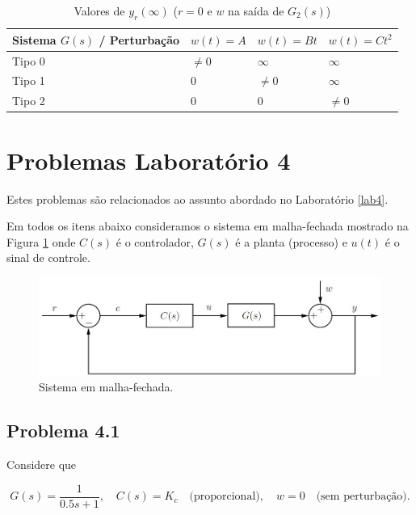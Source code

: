 \documentclass[
]{book}
\theoremstyle{definition}
\theoremstyle{definition}
\theoremstyle{definition}
\theoremstyle{remark}
\begin{document}
\begin{table}

\caption{\label{tab:tab43}Valores de $y_r(\infty)$ ($r=0$ e $w$ na saída de $G_2(s)$)}
\centering
\begin{tabular}[t]{llll}
\toprule
Sistema $G(s)$ / Perturbação & $w(t)=A$ & $w(t) = Bt$ & $w(t) = Ct^2$\\
\midrule
Tipo 0 & $\neq 0$ & $\infty$ & $\infty$\\
Tipo 1 & 0 & $\neq 0$ & $\infty$\\
Tipo 2 & 0 & 0 & $\neq 0$\\
\bottomrule
\end{tabular}
\end{table}

\hypertarget{problemas-laboratuxf3rio-4}{%
\chapter*{Problemas Laboratório 4}\label{problemas-laboratuxf3rio-4}}

Estes problemas são relacionados ao assunto abordado no Laboratório \ref{lab4}.

Em todos os itens abaixo consideramos o sistema em malha-fechada mostrado na Figura \ref{fig:fig43} onde \(C(s)\) é o controlador, \(G(s)\) é a planta (processo) e \(u(t)\) é o sinal de controle.

\begin{figure}
\includegraphics[width=0.8\linewidth]{Imagens/Lab4/Apresentação/fig3} \caption{Sistema em malha-fechada.}\label{fig:fig43}
\end{figure}

\hypertarget{problema-4.1}{%
\section*{Problema 4.1}\label{problema-4.1}}

Considere que

\[
G(s) = \frac {1}{0.5s+1}, \quad C(s) = K_c \quad \text{(proporcional)}, \quad w=0 \quad \text{(sem perturbação)}.
\]
\end{document}
